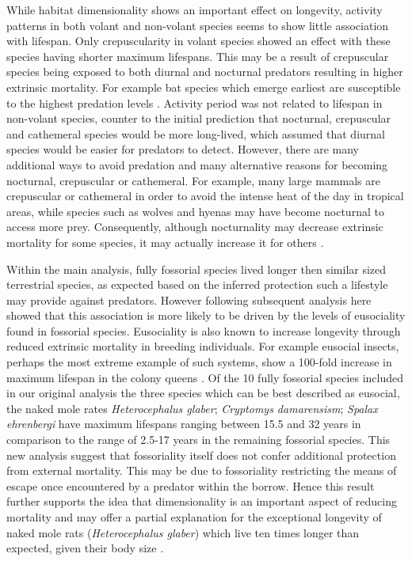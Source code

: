 While habitat dimensionality shows an important effect on longevity, activity patterns in both volant and non-volant species seems to show little association with lifespan. Only crepuscularity in volant species showed an effect with these species having shorter maximum lifespans. This may be a result of crepuscular species being exposed to both diurnal and nocturnal predators resulting in higher extrinsic mortality. For example bat species which emerge earliest are susceptible to the highest predation levels \citep{jones1994foraging}. Activity period was not related to lifespan in non-volant species, counter to the initial prediction that nocturnal, crepuscular and cathemeral species would be more long-lived, which assumed that diurnal species would be easier for predators to detect. However, there are many additional ways to avoid predation and many alternative reasons for becoming nocturnal, crepuscular or cathemeral. For example, many large mammals are crepuscular or cathemeral in order to avoid the intense heat of the day in tropical areas, while species such as wolves and hyenas may have become nocturnal to access more prey. Consequently, although nocturnality may decrease extrinsic mortality for some species, it may actually increase it for others \citep{prugh2014does}.


Within the main analysis, fully fossorial species lived longer then similar sized terrestrial species, as expected based on the inferred protection such a lifestyle may provide against predators. However following \cite{williams2015ecology} subsequent analysis here showed that this association is more likely to be driven by the levels of eusociality found in fossorial species. Eusociality is also known to increase longevity through reduced extrinsic mortality in breeding individuals. For example eusocial insects, perhaps the most extreme example of such systems, show a 100-fold increase in maximum lifespan in the colony queens \citep{keller1997extraordinary}. Of the 10 fully fossorial species included in our original analysis the three species which can be best described as eusocial, the naked mole rates \textit{Heterocephalus glaber}; \textit{Cryptomys damarensism}; \textit{Spalax ehrenbergi} have maximum lifespans ranging between 15.5 and 32 years in comparison to the range of 2.5-17 years in the remaining fossorial species. This new analysis suggest that fossoriality itself does not confer additional protection from external mortality. This may be due to fossoriality restricting the means of escape once encountered by a predator within the borrow. Hence this result further supports the idea that dimensionality is an important aspect of reducing mortality and may offer a partial explanation for the exceptional longevity of naked mole rats (\textit{Heterocephalus glaber}) which live ten times longer than expected, given their body size \citep{buffenstein2002naked}.


